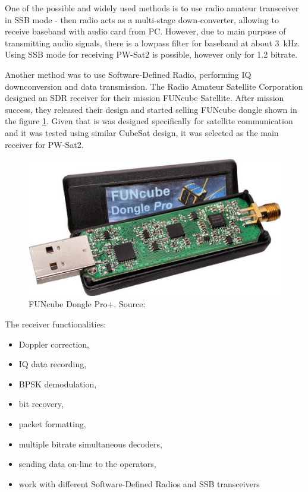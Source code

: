 One of the possible and widely used methods is to use radio amateur transceiver in SSB mode - then radio acts as a multi-stage down-converter, allowing to receive baseband with audio card from PC. However, due to main purpose of transmitting audio signals, there is a lowpass filter for baseband at about \SI{3}{\kHz}. Using SSB mode for receiving PW-Sat2 is possible, however only for \SI{1.2}{\kbps} bitrate.

Another method was to use Software-Defined Radio, performing IQ downconversion and data transmission. The Radio Amateur Satellite Corporation designed an SDR receiver for their mission FUNcube Satellite. After mission success, they released their design and started selling FUNcube dongle shown in the figure \ref{funcube_pic}. Given that is was designed specifically for satellite communication and it was tested using similar CubeSat design, it was selected as the main receiver for PW-Sat2.

\begin{figure}
    \centering
    \includegraphics[width=0.6\paperwidth]{img/2/funcube.jpg}
    \caption{FUNcube Dongle Pro+. Source: \cite{funcube}}
    \label{funcube_pic}
\end{figure}

The receiver  functionalities:
\begin{itemize}
    \item Doppler correction,
    \item IQ data recording,
    \item BPSK demodulation,
    \item bit recovery,
    \item packet formatting,
    \item multiple bitrate simultaneous decoders,
    \item sending data on-line to the operators,
    \item work with different Software-Defined Radios and SSB transceivers
\end{itemize}

